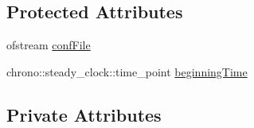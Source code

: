 \subsection*{Protected Attributes}
\begin{DoxyCompactItemize}
\item 
ofstream \hyperlink{class_staged_fixed_perfusion_radius_tree_generator_a63c72bcaee798846d0dbc253faea577d}{conf\+File}
\item 
chrono\+::steady\+\_\+clock\+::time\+\_\+point \hyperlink{class_staged_fixed_perfusion_radius_tree_generator_abedb9de1a91a14d309a0119bb1bb48b8}{beginning\+Time}
\end{DoxyCompactItemize}
\subsection*{Private Attributes}
